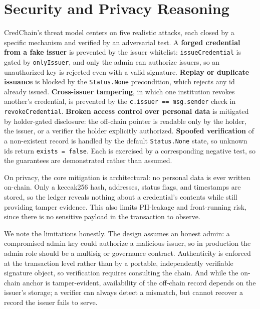 \documentclass[conference]{IEEEtran}
\begin{document}
\section{Security and Privacy Reasoning}
\label{sec:security}
CredChain's threat model centers on five realistic attacks, each closed by a specific mechanism and verified by an adversarial test. A \textbf{forged credential from a fake issuer} is prevented by the issuer whitelist: \texttt{issueCredential} is gated by \texttt{onlyIssuer}, and only the admin can authorize issuers, so an unauthorized key is rejected even with a valid signature. \textbf{Replay or duplicate issuance} is blocked by the \texttt{Status.None} precondition, which rejects any id already issued. \textbf{Cross-issuer tampering}, in which one institution revokes another's credential, is prevented by the \texttt{c.issuer == msg.sender} check in \texttt{revokeCredential}. \textbf{Broken access control over personal data} is mitigated by holder-gated disclosure: the off-chain pointer is readable only by the holder, the issuer, or a verifier the holder explicitly authorized. \textbf{Spoofed verification} of a non-existent record is handled by the default \texttt{Status.None} state, so unknown ids return \texttt{exists = false}. Each is exercised by a corresponding negative test, so the guarantees are demonstrated rather than assumed.

On privacy, the core mitigation is architectural: no personal data is ever written on-chain. Only a keccak256 hash, addresses, status flags, and timestamps are stored, so the ledger reveals nothing about a credential's contents while still providing tamper evidence. This also limits PII-leakage and front-running risk, since there is no sensitive payload in the transaction to observe.

We note the limitations honestly. The design assumes an honest admin: a compromised admin key could authorize a malicious issuer, so in production the admin role should be a multisig or governance contract. Authenticity is enforced at the transaction level rather than by a portable, independently verifiable signature object, so verification requires consulting the chain. And while the on-chain anchor is tamper-evident, availability of the off-chain record depends on the issuer's storage; a verifier can always detect a mismatch, but cannot recover a record the issuer fails to serve.
\end{document}
